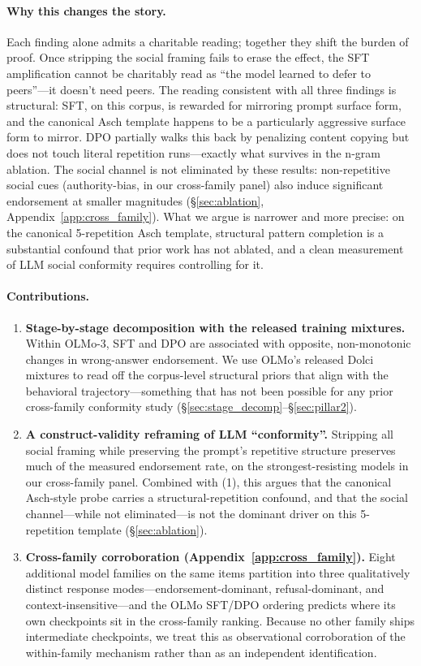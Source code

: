 \documentclass[11pt]{article}
\begin{document}
\paragraph{Why this changes the story.}
Each finding alone admits a charitable reading; together they shift the burden of proof. Once stripping the social framing fails to erase the effect, the SFT amplification cannot be charitably read as ``the model learned to defer to peers''---it doesn't need peers. The reading consistent with all three findings is structural: SFT, on this corpus, is rewarded for mirroring prompt surface form, and the canonical Asch template happens to be a particularly aggressive surface form to mirror. DPO partially walks this back by penalizing content copying but does not touch literal repetition runs---exactly what survives in the n-gram ablation. The social channel is not eliminated by these results: non-repetitive social cues (authority-bias, in our cross-family panel) also induce significant endorsement at smaller magnitudes (\S\ref{sec:ablation}, Appendix~\ref{app:cross_family}). What we argue is narrower and more precise: on the canonical 5-repetition Asch template, structural pattern completion is a substantial confound that prior work has not ablated, and a clean measurement of LLM social conformity requires controlling for it.

\paragraph{Contributions.}
\begin{enumerate}
    \item \textbf{Stage-by-stage decomposition with the released training mixtures.} Within OLMo-3, SFT and DPO are associated with opposite, non-monotonic changes in wrong-answer endorsement. We use OLMo's released Dolci mixtures to read off the corpus-level structural priors that align with the behavioral trajectory---something that has not been possible for any prior cross-family conformity study (\S\ref{sec:stage_decomp}--\S\ref{sec:pillar2}).
    \item \textbf{A construct-validity reframing of LLM ``conformity''.} Stripping all social framing while preserving the prompt's repetitive structure preserves much of the measured endorsement rate, on the strongest-resisting models in our cross-family panel. Combined with (1), this argues that the canonical Asch-style probe carries a structural-repetition confound, and that the social channel---while not eliminated---is not the dominant driver on this 5-repetition template (\S\ref{sec:ablation}).
    \item \textbf{Cross-family corroboration (Appendix~\ref{app:cross_family}).} Eight additional model families on the same items partition into three qualitatively distinct response modes---endorsement-dominant, refusal-dominant, and context-insensitive---and the OLMo SFT/DPO ordering predicts where its own checkpoints sit in the cross-family ranking. Because no other family ships intermediate checkpoints, we treat this as observational corroboration of the within-family mechanism rather than as an independent identification.
\end{enumerate}
\end{document}
